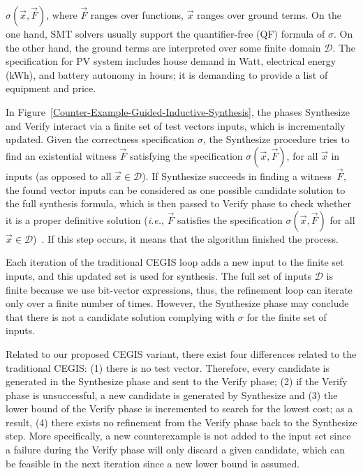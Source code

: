 \documentclass[review]{elsarticle}
\begin{document}
$\sigma(\vec{x}, \vec{F})$, where $\vec{F}$ ranges over functions, $\vec{x}$ ranges over ground terms. On the one hand, SMT solvers usually support the quantifier-free (QF) formula of $\sigma$. On the other hand, the ground terms are interpreted over some finite domain $\mathcal{D}$. The specification for PV system includes house demand in Watt, electrical energy (kWh), and battery autonomy in hours; it is demanding to provide a list of equipment and price.

In Figure~\ref{Counter-Example-Guided-Inductive-Synthesis}, the phases {\sc Synthesize} and {\sc Verify} interact via a finite set of test vectors {\sc inputs}, which is incrementally updated. Given the correctness specification $\sigma$, the {\sc Synthesize} procedure tries to find an existential witness $\vec{F}$ satisfying the specification $\sigma(\vec{x}, \vec{F})$, for all $\vec{x}$ in {\sc inputs} (as opposed to all $\vec{x} \in \mathcal{D}$). If {\sc Synthesize} succeeds in finding a witness~$\vec{F}$, the found vector {\sc inputs} can be considered as one possible candidate solution to the full synthesis formula, which is then passed to {\sc Verify} phase to check whether it is a proper definitive solution ({\it i.e.}, $\vec{F}$ satisfies the specification $\sigma(\vec{x}, \vec{F})$ for all $\vec{x}\in\mathcal{D}$)~\citep{iet-cps.2018.5006}. If this step occurs, it means that the algorithm finished the process. 

Each iteration of the traditional CEGIS loop adds a new input to the finite set {\sc inputs}, and this updated set is used for synthesis. The full set of inputs $\mathcal{D}$ is finite because we use bit-vector expressions, thus, the refinement loop can iterate only over a finite number of times. However, the {\sc Synthesize} phase may conclude that there is not a candidate solution complying with $\sigma$ for the finite set of {\sc inputs}.

Related to our proposed CEGIS variant, there exist four differences related to the traditional CEGIS:
(1) there is no test vector. Therefore, every candidate is generated in the {\sc Synthesize} phase and sent to the {\sc Verify} phase; 
(2) if the {\sc Verify} phase is unsuccessful, a new candidate is generated by {\sc Synthesize} and 
(3) the lower bound of the {\sc Verify} phase is incremented to search for the lowest cost; as a result,
(4) there exists no refinement from the {\sc Verify} phase back to the {\sc Synthesize} step. More specifically, a new counterexample is not added to the {\sc input} set since a failure during the {\sc Verify} phase will only discard a given candidate, which can be feasible in the next iteration since a new lower bound is assumed.
\end{document}

